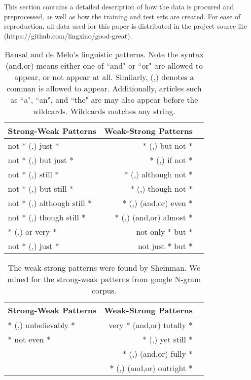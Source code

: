 \documentclass[11pt,letterpaper]{article}
\begin{document}
This section contains a detailed description of how the data is procured and preprocessed, as well as how the training and test sets are created. For ease of reproduction, all data used for this paper is distributed in the project source file (https://github.com/lingxiao/good-great).

\begin{table}
\small
\centering
\begin{tabular}{|l|rl|}
\hline \bf Strong-Weak Patterns & \bf Weak-Strong Patterns & \\ \hline
not  * (,) just *           &  * (,) but not *         & \\
not  * (,) but just *       &  * (,) if not *          & \\
not  * (,) still *          &  * (,) although not *    &  \\
not  * (,) but still *      &  * (,) though not *      & \\
not  * (,) although still * &  * (,) (and,or) even *   & \\
not  * (,) though still *   &  * (,) (and,or) almost * & \\
* (,) or very *             & not only * but *         & \\
not  * (,) just *           & not just * but *         & \\
\hline
\end{tabular}
\caption{\label{font-table} Bansal and de Melo's linguistic patterns. Note the syntax (and,or) means either one of ``and" or ``or" are allowed to appear, or not appear at all. Similarly, (,) denotes a comman is allowed to appear. Additionally, articles such as ``a", ``an", and ``the" are may also appear before the wildcards. Wildcards matches any string.}
\end{table}

\begin{table}
\small
\centering
\begin{tabular}{|l|rl|}
\hline \bf Strong-Weak Patterns & \bf Weak-Strong Patterns & \\ \hline
* (,) unbelievably *     &  very * (and,or) totally *   & \\
* not even *             &  * (,) yet still *           & \\
                         &  * (,) (and,or) fully *      & \\
                         &  * (,) (and,or) outright *   & \\
\hline
\end{tabular}
\caption{\label{font-table} The weak-strong patterns were found by Sheinman. We mined for the strong-weak patterns from google N-gram corpus.}
\end{table}
\end{document}
